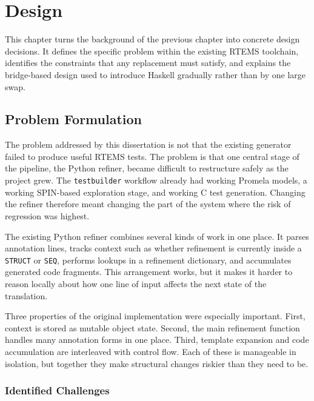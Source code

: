 \chapter{Design}
\label{chap:Design}


This chapter turns the background of the previous chapter into concrete design decisions. It defines the specific problem within the existing RTEMS toolchain, identifies the constraints that any replacement must satisfy, and explains the bridge-based design used to introduce Haskell gradually rather than by one large swap.

\section{Problem Formulation}
\label{sec:ProblemFormulation}

The problem addressed by this dissertation is not that the existing generator failed to produce useful RTEMS tests. The problem is that one central stage of the pipeline, the Python refiner, became difficult to restructure safely as the project grew. The \texttt{testbuilder} workflow already had working Promela models, a working SPIN-based exploration stage, and working C test generation. Changing the refiner therefore meant changing the part of the system where the risk of regression was highest.

The existing Python refiner combines several kinds of work in one place. It parses annotation lines, tracks context such as whether refinement is currently inside a \texttt{STRUCT} or \texttt{SEQ}, performs lookups in a refinement dictionary, and accumulates generated code fragments. This arrangement works, but it makes it harder to reason locally about how one line of input affects the next state of the translation.

Three properties of the original implementation were especially important. First, context is stored as mutable object state. Second, the main refinement function handles many annotation forms in one place. Third, template expansion and code accumulation are interleaved with control flow. Each of these is manageable in isolation, but together they make structural changes riskier than they need to be.

\subsection{Identified Challenges}

